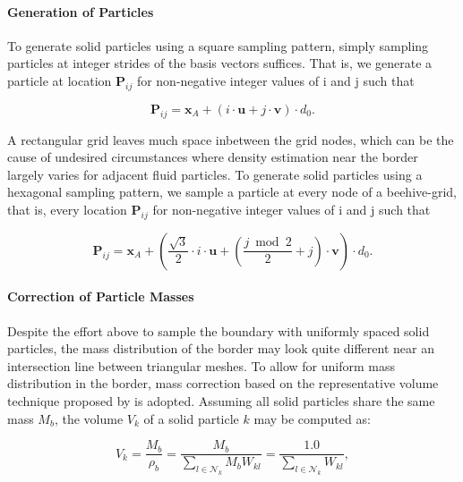\documentclass[
	11pt, 
	DIV10,
	ngerman,
	a4paper, 
	oneside, 
	headings=normal, 
	captions=tableheading,
	final, 
	numbers=noenddot
]{scrartcl}
\begin{document}
\paragraph{Generation of Particles} To generate solid particles using a square sampling pattern, simply sampling particles at integer strides of the basis vectors suffices. That is, we generate a particle at location $ \boldsymbol{P}_{ij} $ for non-negative integer values of i and j such that

\begin{equation}
	\label{eq8}
	\boldsymbol{P}_{ij} = \boldsymbol{x}_{A} + \left(i \cdot \boldsymbol{u} + j \cdot \boldsymbol{v}\right) \cdot d_{0}.
\end{equation}

A rectangular grid leaves much space inbetween the grid nodes, which can be the cause of undesired circumstances where density estimation near the border largely varies for adjacent fluid particles. To generate solid particles using a hexagonal sampling pattern, we sample a particle at every node of a beehive-grid, that is, every location $ \boldsymbol{P}_{ij} $ for non-negative integer values of i and j such that

\begin{equation}
	\label{eq9}
	\boldsymbol{P}_{ij} = \boldsymbol{x}_{A} + \left(\frac{\sqrt{3}}{2} \cdot i \cdot \boldsymbol{u} + \left( \frac{j \bmod 2}{2} + j\right) \cdot \boldsymbol{v}\right) \cdot d_{0}.
\end{equation}

\paragraph{Correction of Particle Masses} Despite the effort above to sample the boundary with uniformly spaced solid particles, the mass distribution of the border may look quite different near an intersection line between triangular meshes. To allow for uniform mass distribution in the border, mass correction based on the representative volume technique proposed by \cite{akinci2012versatile} is adopted. Assuming all solid particles share the same mass $ M_{b} $, the volume $ V_{k} $ of a solid particle $ k $ may be computed as:

\begin{equation}
	\label{eq10}
    V_{k} = \frac{M_{b}}{\rho_{b}} = \frac{M_{b}}{\sum_{l \in \mathcal{N}_{k}} M_{b} W_{kl}} = \frac{1.0}{\sum_{l \in \mathcal{N}_{k}} W_{kl}},
\end{equation}
\end{document}
